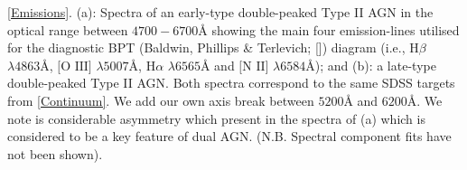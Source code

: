 \label{Emissions} \ref{Emissions}. (a): Spectra of an early-type double-peaked Type II AGN in the optical range between $4700-6700Å$ showing the main four emission-lines utilised for the diagnostic BPT (Baldwin, Phillips \& Terlevich; [\cite{Baldwin_1981}]) diagram (i.e., $\text{H}\beta$ $\lambda4863Å$, $\text{[O III]}$ $\lambda5007Å$, $\text{H}\alpha$ $\lambda6565Å$ and $\text{[N II]}$ $\lambda6584Å$); and (b): a late-type double-peaked Type II AGN. Both spectra correspond to the same SDSS targets from \ref{Continuum}. We add our own axis break between $5200Å$ and $6200Å$. We note is considerable asymmetry which present in the spectra of (a) which is considered to be a key feature of dual AGN. (N.B. Spectral component fits have not been shown).
  